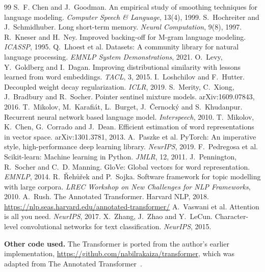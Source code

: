 \documentclass[10pt]{article}
\begin{document}
\begin{thebibliography}{99}\small
{} S.~F. Chen and J.~Goodman. An empirical study of smoothing techniques for language modeling. \emph{Computer Speech \& Language}, 13(4), 1999.
 S.~Hochreiter and J.~Schmidhuber. Long short-term memory. \emph{Neural Computation}, 9(8), 1997.
 R.~Kneser and H.~Ney. Improved backing-off for M-gram language modeling. \emph{ICASSP}, 1995.
 Q.~Lhoest et al. Datasets: A community library for natural language processing. \emph{EMNLP System Demonstrations}, 2021.
 O.~Levy, Y.~Goldberg and I.~Dagan. Improving distributional similarity with lessons learned from word embeddings. \emph{TACL}, 3, 2015.
 I.~Loshchilov and F.~Hutter. Decoupled weight decay regularization. \emph{ICLR}, 2019.
 S.~Merity, C.~Xiong, J.~Bradbury and R.~Socher. Pointer sentinel mixture models. arXiv:1609.07843, 2016.
 T.~Mikolov, M.~Karafi\'at, L.~Burget, J.~\v{C}ernock\'y and S.~Khudanpur. Recurrent neural network based language model. \emph{Interspeech}, 2010.
 T.~Mikolov, K.~Chen, G.~Corrado and J.~Dean. Efficient estimation of word representations in vector space. arXiv:1301.3781, 2013.
 A.~Paszke et al. PyTorch: An imperative style, high-performance deep learning library. \emph{NeurIPS}, 2019.
 F.~Pedregosa et al. Scikit-learn: Machine learning in Python. \emph{JMLR}, 12, 2011.
 J.~Pennington, R.~Socher and C.~D. Manning. GloVe: Global vectors for word representation. \emph{EMNLP}, 2014.
 R.~\v{R}eh\r{u}\v{r}ek and P.~Sojka. Software framework for topic modelling with large corpora. \emph{LREC Workshop on New Challenges for NLP Frameworks}, 2010.
 A.~Rush. The Annotated Transformer. Harvard NLP, 2018. \url{https://nlp.seas.harvard.edu/annotated-transformer/}
 A.~Vaswani et al. Attention is all you need. \emph{NeurIPS}, 2017.
 X.~Zhang, J.~Zhao and Y.~LeCun. Character-level convolutional networks for text classification. \emph{NeurIPS}, 2015.
\end{thebibliography}

\noindent\textbf{Other code used.} The Transformer is ported from the author's earlier implementation, \url{https://github.com/nabilrakaiza/transformer}, which was adapted from The Annotated Transformer~\cite{rush2018}.
\end{document}
